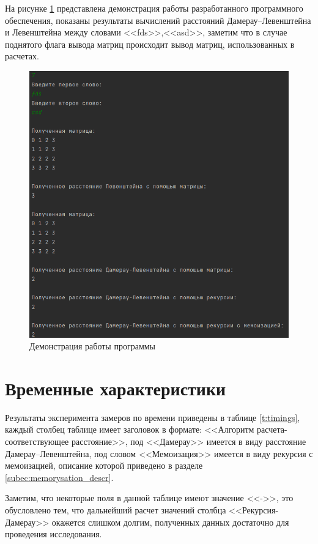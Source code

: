 На рисунке \ref{img:demonstration} представлена демонстрация работы разработанного программного обеспечения, 
показаны результаты вычислений расстояний Дамерау--Левенштейна и Левенштейна между словами <<fds>>,<<asd>>, заметим
что в случае поднятого флага вывода матриц происходит вывод матриц, использованных в расчетах.
\clearpage
\begin{figure}[H]
	\centering
	\includegraphics[height=0.7\textheight]{../img/programm_work.png}
	\caption{Демонстрация работы программы}
	\label{img:demonstration}
\end{figure}

\clearpage

\section{Временные характеристики}

Результаты эксперимента замеров по времени приведены в таблице \ref{t:timings}, каждый столбец таблице имеет заголовок в формате:
<<Алгоритм расчета-соответствующее расстояние>>, под <<Дамерау>> имеется в виду расстояние Дамерау--Левенштейна, под словом
<<Мемоизация>> имеется в виду  рекурсия с мемоизацией, описание которой приведено в разделе \ref{subec:memorysation_descr}.

Заметим, что некоторые поля в данной таблице
имеют значение <<->>, это обусловлено тем, что дальнейший расчет значений столбца <<Рекурсия-Дамерау>> окажется слишком
долгим, полученных данных достаточно для проведения исследования.

